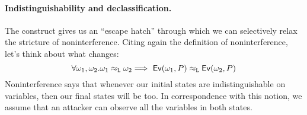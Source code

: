 \documentclass[11pt,twoside]{scrartcl}
\begin{document}
\paragraph{Indistinguishability and declassification.}
The  construct gives us an ``escape hatch'' through which we can selectively relax the stricture of noninterference. Citing again the definition of noninterference, let's think about what  changes:
\[
\forall \omega_1, \omega_2 . \omega_1 \approx_{\texttt{\upshape L}} \omega_2 \Longrightarrow\ \mathsf{Ev}(\omega_1,P) \approx_{\texttt{\upshape L}} \mathsf{Ev}(\omega_2,P)
\]
Noninterference says that whenever our initial states are indistinguishable on \lowsec variables, then our final states will be too. In correspondence with this notion, we assume that an attacker can observe all the \lowsec variables in both states.
\end{document}
